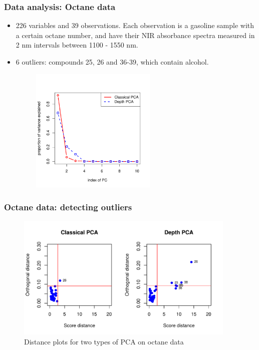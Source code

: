 \documentclass[handout,10pt]{beamer}
\begin{document}
\begin{frame}
\frametitle{Data analysis: Octane data}
\begin{itemize}
\item 226 variables and 39 observations. Each observation is a gasoline sample with a certain octane number, and have their NIR absorbance spectra measured in 2 nm intervals between 1100 - 1550 nm.
\vspace{.2cm}

\item 6 outliers: compounds 25, 26 and 36-39, which contain alcohol.
\vspace{.2cm}

\begin{figure}[t]
	\centering
		\includegraphics[height=6cm]{octane_screeplot.pdf}
	\label{fig:screeplot}
\end{figure}
\end{itemize}
\end{frame}

\begin{frame}
\frametitle{Octane data: detecting outliers}
\begin{figure}[h]
	\centering
		\includegraphics[height=6cm]{octane_distanceplot.pdf}
	\caption{Distance plots for two types of PCA on octane data}
	\label{fig:distplot}
\end{figure}
\end{frame}
\end{document}
